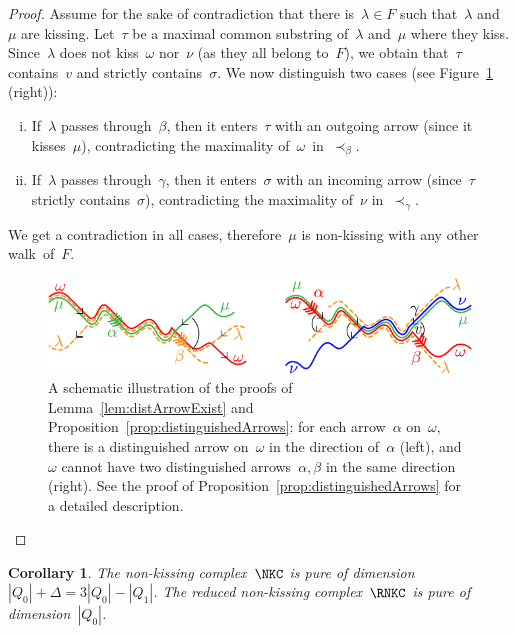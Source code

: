 \documentclass{amsart}
\newtheorem{corollary}[theorem]{Corollary}
\theoremstyle{definition}
\newcommand{\fref}[1]{Figure~\ref{#1}} %
\begin{document}
\begin{proof}
Assume for the sake of contradiction that there is~$\lambda \in F$ such that~$\lambda$ and~$\mu$ are kissing.
Let~$\tau$ be a maximal common substring of~$\lambda$ and~$\mu$ where they kiss.
Since~$\lambda$ does not kiss~$\omega$ nor~$\nu$ (as they all belong to~$F$), we obtain that~$\tau$ contains~$v$ and strictly contains~$\sigma$.
We now distinguish two cases (see \fref{fig:pure}\,(right)):
\begin{enumerate}[(i)]
\item If~$\lambda$ passes through~$\beta$, then it enters~$\tau$ with an outgoing arrow (since it kisses~$\mu$), contradicting the maximality of~$\omega$~in~$\prec_\beta$.
\item If~$\lambda$ passes through~$\gamma$, then it enters~$\sigma$ with an incoming arrow (since~$\tau$ strictly contains~$\sigma$), contradicting the maximality of~$\nu$ in~$\prec_\gamma$. 
\end{enumerate}
We get a contradiction in all cases, therefore~$\mu$ is non-kissing with any other walk~of~$F$.
%
\begin{figure}[t]
	\capstart
	\centerline{\includegraphics[scale=1]{pure}}
	\caption{A schematic illustration of the proofs of Lemma~\ref{lem:distArrowExist} and Proposition~\ref{prop:distinguishedArrows}: for each arrow~$\alpha$ on~$\omega$, there is a distinguished arrow on~$\omega$ in the direction of~$\alpha$ (left), and~$\omega$ cannot have two distinguished arrows~$\alpha, \beta$ in the same direction (right). See the proof of Proposition~\ref{prop:distinguishedArrows} for a detailed description.}
	\label{fig:pure}
\end{figure}
\end{proof}

\begin{corollary}
\label{coro:pure}
The non-kissing complex~$\NKC$ is pure of dimension~$|Q_0| + \Delta = 3|Q_0|-|Q_1|$. The reduced non-kissing complex~$\RNKC$ is pure of dimension~$|Q_0|$.
\end{corollary}
\end{document}

